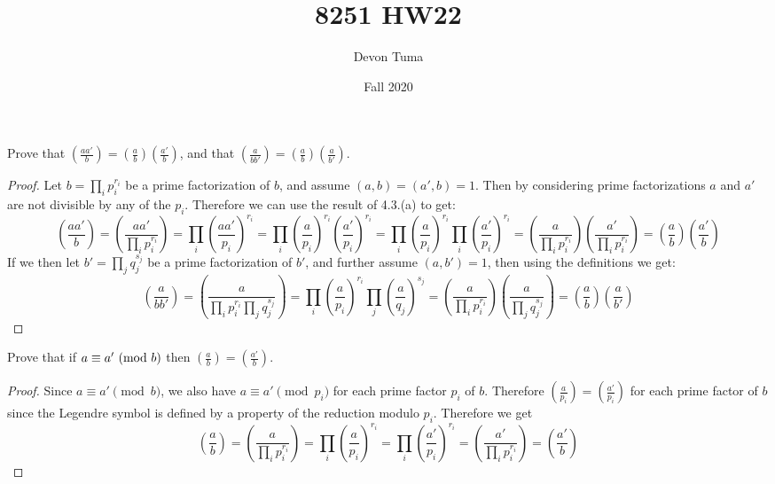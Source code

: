 \documentclass[11pt]{article}
\title{8251 HW22}
\author{Devon Tuma}
\date{Fall 2020}
\newcommand{\legendre}[2]{\genfrac{(}{)}{}{}{#1}{#2}}
\begin{document}
\maketitle


Prove that $\legendre{aa'}{b} = \legendre{a}{b}\legendre{a'}{b}$, and that $\legendre{a}{bb'} = \legendre{a}{b}\legendre{a}{b'}$.
\begin{proof}
  Let $b = \prod_i p_i^{r_i}$ be a prime factorization of $b$, and assume $(a,b) = (a',b) = 1$. Then by considering prime factorizations $a$ and $a'$ are not divisible by any of the $p_i$. Therefore we can use the result of 4.3.(a) to get:
  \begin{equation*}
    \legendre{aa'}{b} = \legendre{aa'}{\prod_i p_i^{r_i}}
    = \prod_i \legendre{aa'}{p_i}^{r_i}
    = \prod_i \legendre{a}{p_i}^{r_i} \legendre{a'}{p_i}^{r_i}
    = \prod_i \legendre{a}{p_i}^{r_i} \prod_i \legendre{a'}{p_i}^{r_i}
    = \legendre{a}{\prod_i p_i^{r_i}} \legendre{a'}{\prod_i p_i^{r_i}}
    = \legendre{a}{b} \legendre{a'}{b}
  \end{equation*}
  If we then let $b' = \prod_j q_j^{s_j}$ be a prime factorization of $b'$, and further assume $(a,b') = 1$, then using the definitions we get:
  \begin{equation*}
    \legendre{a}{bb'} = \legendre{a}{\prod_i p_i^{r_i} \prod_j q_j^{s_j}}
    = \prod_i \legendre{a}{p_i}^{r_i} \prod_j \legendre{a}{q_j}^{s_j}
    = \legendre{a}{\prod_i p_i^{r_i}} \legendre {a}{\prod_j q_j^{s_j}}
    = \legendre{a}{b} \legendre{a}{b'}
  \end{equation*}
\end{proof}

Prove that if $a \equiv a'\ (\text{mod}\ b)$ then $\legendre{a}{b} = \legendre{a'}{b}$.
\begin{proof}
  Since $a \equiv a' \pmod b$, we also have $a \equiv a' \pmod p_i$ for each prime factor $p_i$ of $b$. Therefore $\legendre{a}{p_i} = \legendre{a'}{p_i}$ for each prime factor of $b$ since the Legendre symbol is defined by a property of the reduction modulo $p_i$. Therefore we get
  \begin{equation*}
    \legendre{a}{b} = \legendre{a}{\prod_i p_i^{r_i}}
    = \prod_i \legendre{a}{p_i}^{r_i}
    = \prod_i \legendre{a'}{p_i}^{r_i}
    = \legendre{a'}{\prod_i p_i^{r_i}}
    = \legendre{a'}{b}
  \end{equation*}
\end{proof}
\end{document}
